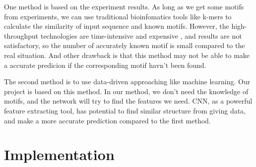 \documentclass[twoside,twocolumn]{article}
\begin{document}
One method is based on the experiment results. As long as we get some motifs from experiments, we can use traditional bioinfomatics tools like k-mers to calculate the similarity of input sequence and known motifs. However, the high-throughput technologies are time-intensive and expensive \cite{ref1}, and results are not satisfactory, so the number of accurately known motif is small compared to the real situation. And other drawback is that this method may not be able to make a accurate predicion if the corresponding motif havn't been found.

The second method is to use data-driven approaching like machine learning. Our project is based on this method. In our method, we don't need the knowledge of motifs, and the network will try to find the features we need. CNN, as a powerful feature extracting tool, has potential to find similar structure from giving data, and make a more accurate prediction compared to the first method.
\section{Implementation}
\end{document}
